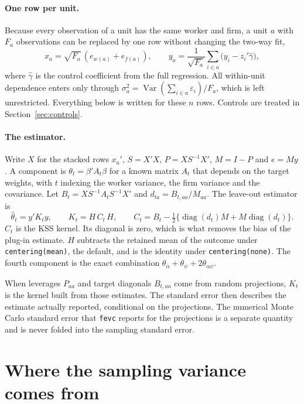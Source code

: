 \documentclass[11pt]{article}
\newcommand{\Var}{\operatorname{Var}}
\newcommand{\diag}{\operatorname{diag}}
\newcommand{\fevc}{\texttt{fevc}}
\begin{document}
\paragraph{One row per unit.} Because every observation of a unit has the
same worker and firm, a unit $a$ with $F_a$ observations can be replaced by
one row without changing the two-way fit,
\begin{equation}\label{eq:collapse}
 x_a=\sqrt{F_a}\,(e_{w(a)}+e_{f(a)}),\qquad
 y_a=\frac{1}{\sqrt{F_a}}\sum_{i\in a}\bigl(y_i-z_i'\hat\gamma\bigr),
\end{equation}
where $\hat\gamma$ is the control coefficient from the full regression. All
within-unit dependence enters only through
$\sigma_a^2=\Var(\sum_{i\in a}\varepsilon_i)/F_a$, which is left unrestricted.
Everything below is written for these $n$ rows. Controls are treated in
Section~\ref{sec:controls}.

\paragraph{The estimator.} Write $X$ for the stacked rows $x_a'$,
$S=X'X$, $P=XS^{-1}X'$, $M=I-P$ and $e=My$. A component is
$\theta_t=\beta'A_t\beta$ for a known matrix $A_t$ that depends on the
target weights, with $t$ indexing the worker variance, the firm variance and
the covariance. Let $B_t=XS^{-1}A_tS^{-1}X'$ and
$d_{ta}=B_{t,aa}/M_{aa}$. The leave-out estimator is
\begin{equation}\label{eq:kernel}
 \hat\theta_t=y'K_ty,\qquad
 K_t=H\,C_t\,H,\qquad
 C_t=B_t-\tfrac12\{\diag(d_t)M+M\diag(d_t)\}.
\end{equation}
$C_t$ is the KSS kernel. Its diagonal is zero, which is what removes the bias
of the plug-in estimate. $H$ subtracts the retained mean of the outcome under
\texttt{centering(mean)}, the default, and is the identity under
\texttt{centering(none)}. The fourth component is the exact combination
$\theta_\alpha+\theta_\psi+2\theta_{\alpha\psi}$.

When leverages $P_{aa}$ and target diagonals $B_{t,aa}$ come from random
projections, $K_t$ is the kernel built from those estimates. The standard
error then describes the estimate actually reported, conditional on the
projections. The numerical Monte Carlo standard error that \fevc{} reports
for the projections is a separate quantity and is never folded into the
sampling standard error.

\section{Where the sampling variance comes from}\label{sec:variance}
\end{document}

